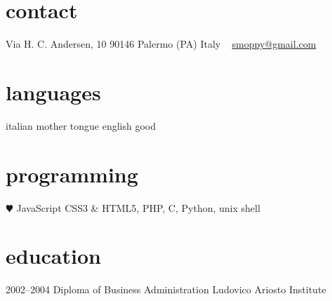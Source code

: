 \documentclass[]{friggeri-cv} %
\begin{document}


\begin{aside} %
\section{contact}
Via H. C. Andersen, 10
90146 Palermo (PA)
Italy
~
\href{mailto:smoppy@gmail.com}{smoppy@gmail.com}
\section{languages}
italian mother tongue
english good
\section{programming}
{\color{red} $\varheartsuit$} JavaScript
CSS3 \& HTML5,
PHP, C, Python, unix shell
\end{aside}

\section{education}
\begin{entrylist}
\entry
{2002--2004}
{Diploma {\normalfont of Business Administration}}
{Ludovico Ariosto Institute}
{}
\end{entrylist}

\end{document}
